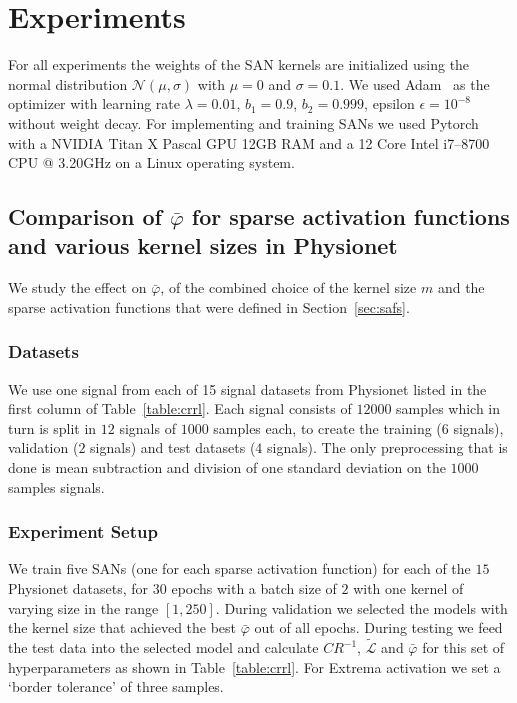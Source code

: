\documentclass[journal]{IEEEtran}
\begin{document}
\section{Experiments}\label{sec:experiments}
For all experiments the weights of the SAN kernels are initialized using the normal distribution $\mathcal{N}(\mu, \sigma)$ with $\mu=0$ and $\sigma=0.1$.
We used Adam~\cite{kingma2014adam} as the optimizer with learning rate $\lambda=0.01$, $b_1=0.9$, $b_2=0.999$, epsilon $\epsilon=10^{-8}$ without weight decay.
For implementing and training SANs we used Pytorch~\cite{paszke2017automatic} with a NVIDIA Titan X Pascal GPU 12GB RAM and a 12 Core Intel i7--8700 CPU @ 3.20GHz on a Linux operating system.

\subsection{Comparison of $\bar\varphi$ for sparse activation functions and various kernel sizes in Physionet}
We study the effect on $\bar\varphi$, of the combined choice of the kernel size $m$ and the sparse activation functions that were defined in Section~\ref{sec:safs}.

\subsubsection{Datasets}
We use one signal from each of 15 signal datasets from Physionet listed in the first column of Table~\ref{table:crrl}.
Each signal consists of $12000$ samples which in turn is split in $12$ signals of $1000$ samples each, to create the training ($6$ signals), validation ($2$ signals) and test datasets ($4$ signals).
The only preprocessing that is done is mean subtraction and division of one standard deviation on the $1000$ samples signals.

\subsubsection{Experiment Setup}
We train five SANs (one for each sparse activation function) for each of the $15$ Physionet datasets, for $30$ epochs with a batch size of $2$ with one kernel of varying size in the range $[1, 250]$.
During validation we selected the models with the kernel size that achieved the best $\bar\varphi$ out of all epochs.
During testing we feed the test data into the selected model and calculate $CR^{-1}$, $\tilde{\mathcal{L}}$ and $\bar\varphi$ for this set of hyperparameters as shown in Table~\ref{table:crrl}.
For Extrema activation we set a `border tolerance' of three samples.
\end{document}
